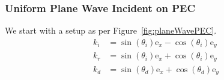 \documentclass[lettersize,journal]{IEEEtran}
\begin{document}
        \subsubsection{Uniform Plane Wave Incident on PEC}    
            We start with a setup as per Figure~\ref{fig:planeWavePEC}. 
            \begin{subequations}
                \begin{align}
                    k_i &= \sin (\theta_i) \text{e}_x - \cos (\theta_i) \text{e}_y \\
                    k_r &= \sin (\theta_i) \text{e}_x + \cos (\theta_i) \text{e}_y \\
                    k_d &= \sin (\theta_d) \text{e}_x + \cos (\theta_d) \text{e}_y
                \end{align}
            \end{subequations}
\end{document}
